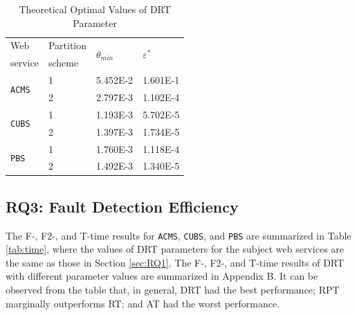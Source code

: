 \documentclass[10pt,journal,compsoc]{IEEEtran}
\begin{document}
\begin{table}
  \caption{Theoretical Optimal Values of DRT Parameter}
  \centering
  \label{tab:parameters}
  \begin{tabular}{llll} \toprule
     Web                         & Partition  &\multirow{2}{*}{$\theta_{min}$}   &\multirow{2}{*}{$\varepsilon^{*}$}    \\
     service                     & scheme     &                 &                \\ \midrule
     \multirow{2}{*}{\texttt{ACMS}}       &1           &5.452E-2         &1.601E-1        \\
                                 &2           &2.797E-3         &1.102E-4        \\ \midrule
     \multirow{2}{*}{\texttt{CUBS}}       &1           &1.193E-3         &5.702E-5        \\
                                 &2           &1.397E-3         &1.734E-5        \\ \midrule
     \multirow{2}{*}{\texttt{PBS}}        &1           &1.760E-3         &1.118E-4        \\ \
                                 &2           &1.492E-3         &1.340E-5        \\ \bottomrule
  \end{tabular}
\end{table}

\subsection{RQ3: Fault Detection Efficiency}
\label{sec:RQ3}

The F-, F2-, and T-time results for \texttt{ACMS}, \texttt{CUBS}, and \texttt{PBS} are summarized in Table \ref{tab:time}, where the values of DRT parameters for the subject web services are the same as those in Section \ref{sec:RQ1}. The F-, F2-, and T-time results of DRT with different parameter values are summarized in Appendix B. It can be observed from the table that, in general, DRT had the best performance; RPT marginally outperforms RT; and AT had the worst performance.
\end{document}
